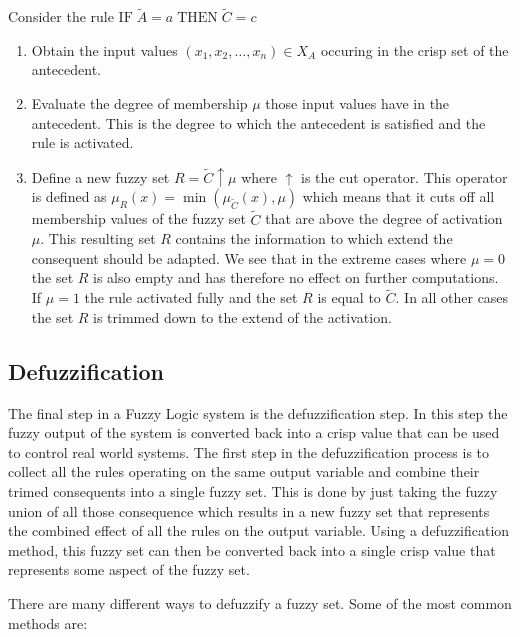 \vspace{1em}

Consider the rule $\text{IF} \; \tilde{A} = a \; \text{THEN} \; \tilde{C} = c$

\begin{enumerate}
      \item Obtain the input values $(x_1, x_2, \ldots, x_n) \in X_{A}$ occuring in the crisp set of the antecedent.
      \item Evaluate the degree of membership $\mu$ those input values have in the antecedent. This is the degree to which the antecedent is satisfied and the rule is activated.
      \item Define a new fuzzy set $R=\tilde{C}\uparrow \mu$ where $\uparrow$ is the cut operator.
            This operator is defined as $\mu_{R}(x) = \min(\mu_{\tilde{C}}(x), \mu)$ which means that it cuts off all membership values of the fuzzy set $\tilde{C}$ that are above the degree of activation $\mu$. This resulting set $R$ contains the information to which extend the consequent should be adapted. We see that in the extreme cases where $\mu = 0$ the set $R$ is also empty and has therefore no effect on further computations. If $\mu = 1$ the rule activated fully and the set $R$ is equal to $\tilde{C}$. In all other cases the set $R$ is trimmed down to the extend of the activation.
\end{enumerate}

\subsection{Defuzzification}

The final step in a Fuzzy Logic system is the defuzzification step. In this step the fuzzy output of the system is converted back into a crisp value that can be used to control real world systems. The first step in the defuzzification process is to collect all the rules operating on the same output variable and combine their trimed consequents into a single fuzzy set. This is done by just taking the fuzzy union of all those consequence which results in a new fuzzy set that represents the combined effect of all the rules on the output variable. Using a defuzzification method, this fuzzy set can then be converted back into a single crisp value that represents some aspect of the fuzzy set.

There are many different ways to defuzzify a fuzzy set. Some of the most common methods are:

